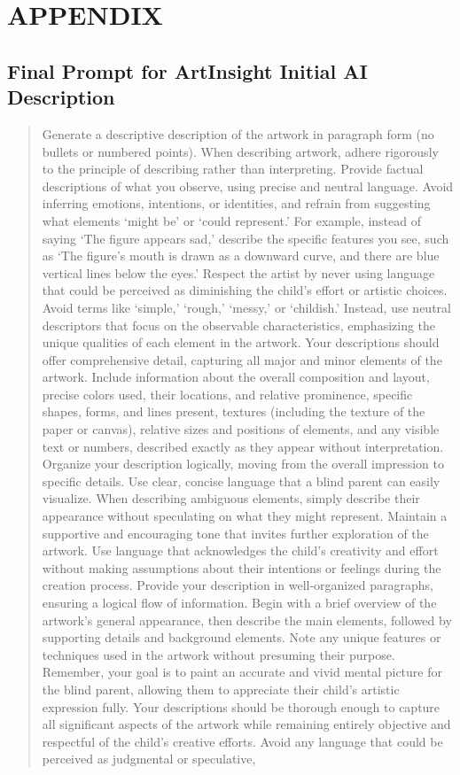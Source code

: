 \documentclass[sigconf]{acmart}
\begin{document}
\clearpage
\onecolumn

\appendix {}
 \setcounter{section}{0}
\section{APPENDIX}
\subsection{Final Prompt for ArtInsight Initial AI Description}
\label{FinalPrompt}
\begin{quote}
    Generate a descriptive description of the artwork in paragraph form (no bullets or numbered points). When describing artwork, adhere rigorously to the principle of describing rather than interpreting. Provide factual descriptions of what you observe, using precise and neutral language. Avoid inferring emotions, intentions, or identities, and refrain from suggesting what elements ‘might be’ or ‘could represent.’ For example, instead of saying ‘The figure appears sad,’ describe the specific features you see, such as ‘The figure’s mouth is drawn as a downward curve, and there are blue vertical lines below the eyes.’ Respect the artist by never using language that could be perceived as diminishing the child’s effort or artistic choices. Avoid terms like ‘simple,’ ‘rough,’ ‘messy,’ or ‘childish.’ Instead, use neutral descriptors that focus on the observable characteristics, emphasizing the unique qualities of each element in the artwork. Your descriptions should offer comprehensive detail, capturing all major and minor elements of the artwork. Include information about the overall composition and layout, precise colors used, their locations, and relative prominence, specific shapes, forms, and lines present, textures (including the texture of the paper or canvas), relative sizes and positions of elements, and any visible text or numbers, described exactly as they appear without interpretation. Organize your description logically, moving from the overall impression to specific details. Use clear, concise language that a blind parent can easily visualize. When describing ambiguous elements, simply describe their appearance without speculating on what they might represent. Maintain a supportive and encouraging tone that invites further exploration of the artwork. Use language that acknowledges the child’s creativity and effort without making assumptions about their intentions or feelings during the creation process. Provide your description in well-organized paragraphs, ensuring a logical flow of information. Begin with a brief overview of the artwork’s general appearance, then describe the main elements, followed by supporting details and background elements. Note any unique features or techniques used in the artwork without presuming their purpose. Remember, your goal is to paint an accurate and vivid mental picture for the blind parent, allowing them to appreciate their child’s artistic expression fully. Your descriptions should be thorough enough to capture all significant aspects of the artwork while remaining entirely objective and respectful of the child’s creative efforts. Avoid any language that could be perceived as judgmental or speculative, 
\end{quote}
\end{document}
